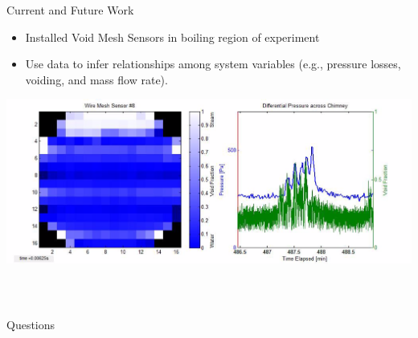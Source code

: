 \documentclass[10pt,t,xcolor=table]{UWMadBeamer}
\begin{document}
\begin{frame} {Current and Future Work}

    \begin{itemize}
        \item Installed Void Mesh Sensors in boiling region of experiment
        \item Use data to infer relationships among system variables (e.g., pressure losses, voiding, and mass flow rate).
    \end{itemize}

        {
        \centering
        \hfill
        \includegraphics[height=0.50\paperheight]{VoidData_01}%
        \hfill
        }
        
\end{frame}





\begin{frame}
    \frametitle{~\ }
    \vbox{}\vfill
    \hfill{\Large Questions}\hfill
    \vbox{}\vfill
\end{frame}
\end{document}
